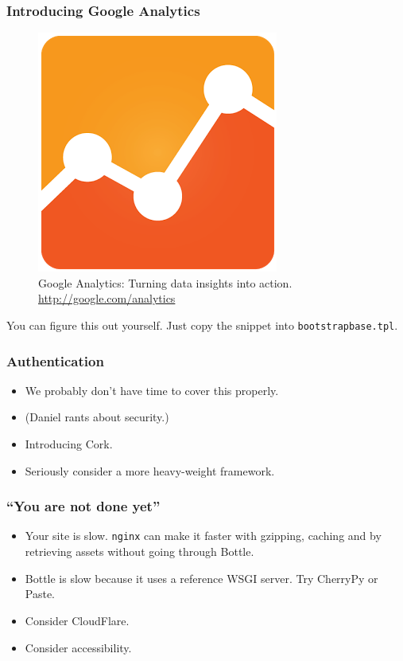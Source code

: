\documentclass{beamer}
\begin{document}
\begin{frame}
  \frametitle{Introducing Google Analytics}
  \begin{figure}[h!]
    \centering
    \includegraphics[scale=0.3]{imgs/ga_logo}
    \caption{Google Analytics: Turning data insights into action. \url{http://google.com/analytics}}
    \label{fig:ga_logo}
  \end{figure}

  You can figure this out yourself. Just copy the snippet into \texttt{bootstrapbase.tpl}.
  
\end{frame}

\begin{frame}
  \frametitle{Authentication}
  \begin{itemize}
  \item<1-> We probably don't have time to cover this properly.
  \item<2-> (Daniel rants about security.)
  \item<3-> Introducing Cork.
  \item<4-> Seriously consider a more heavy-weight framework.
  \end{itemize}
\end{frame}

\begin{frame}
  \frametitle{``You are not done yet''}
  \begin{itemize}
  \item Your site is slow. \texttt{nginx} can make it faster with
    gzipping, caching and by retrieving assets without going through
    Bottle.
  \item Bottle is slow because it uses a reference WSGI server. Try
    CherryPy or Paste.
  \item Consider CloudFlare.
  \item Consider accessibility.
  \end{itemize}
\end{frame}
\end{document}
